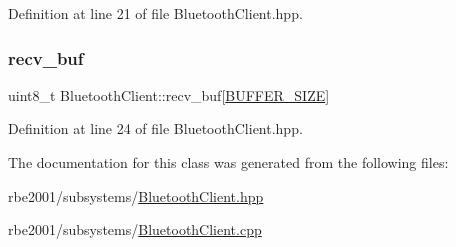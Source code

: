 Definition at line 21 of file Bluetooth\+Client.\+hpp.

\mbox{\label{class_bluetooth_client_a83675b45ddf8021663ecd6200a22b1cb}} 
\subsubsection{\texorpdfstring{recv\+\_\+buf}{recv\_buf}}
{\footnotesize\ttfamily uint8\+\_\+t Bluetooth\+Client\+::recv\+\_\+buf\mbox{[}\hyperlink{class_bluetooth_client_a88edb272fc00fb3c65b9e95281cae00b}{B\+U\+F\+F\+E\+R\+\_\+\+S\+I\+ZE}\mbox{]}\hspace{0.3cm}{\ttfamily [private]}}



Definition at line 24 of file Bluetooth\+Client.\+hpp.



The documentation for this class was generated from the following files\+:\begin{DoxyCompactItemize}
\item 
rbe2001/subsystems/\hyperlink{_bluetooth_client_8hpp}{Bluetooth\+Client.\+hpp}\item 
rbe2001/subsystems/\hyperlink{_bluetooth_client_8cpp}{Bluetooth\+Client.\+cpp}\end{DoxyCompactItemize}
